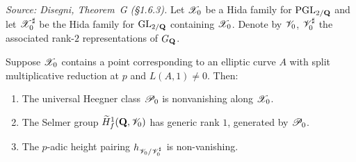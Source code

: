 \begin{theorem}
  \label{thm:TheoremG}
%
  \textit{Source: Disegni, Theorem~G (§1.6.3).}
  Let $\mathscr{X}_0$ be a Hida family for $\mathrm{PGL}_{2/\mathbf{Q}}$ and let
  $\mathscr{X}_0^\sharp$ be the Hida family for $\mathrm{GL}_{2/\mathbf{Q}}$
  containing $\mathscr{X}_0$.  Denote by $\mathscr{V}_0$, $\mathscr{V}_0^\sharp$ the associated
  rank-$2$ representations of $G_{\mathbf{Q}}$.

  Suppose $\mathscr{X}_0$ contains a point corresponding to an elliptic curve
  $A$ with split multiplicative reduction at $p$ and $L(A, 1) \neq 0$.
  Then:
  \begin{enumerate}
    \item The universal Heegner class $\mathscr{P}_0$ is nonvanishing along
          $\mathscr{X}_0$.
    \item The Selmer group $\widetilde{H}^1_f(\mathbf{Q}, \mathscr{V}_0)$ has generic rank $1$,
          generated by $\mathscr{P}_0$.
    \item The $p$-adic height pairing $h_{\mathscr{V}_0/\mathscr{V}_0^\sharp}$ is
          non-vanishing.
  \end{enumerate}
\end{theorem}

